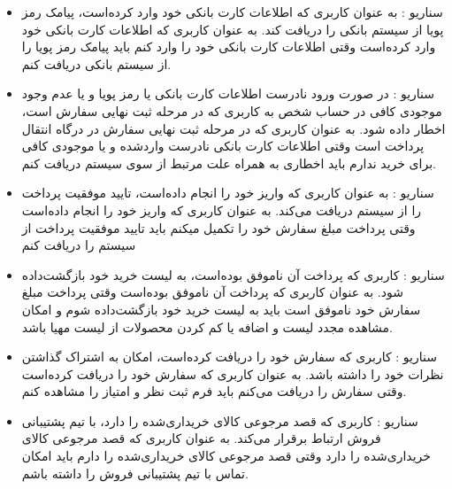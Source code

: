 \documentclass[14pt]{article}
\begin{document}
\begin{flushright}
\begin{itemize}
\item سناریو : به عنوان کاربری که اطلاعات کارت بانکی خود وارد کرده‌است، پیامک رمز پویا از سیستم بانکی را دریافت کند.
\newline
به عنوان کاربری که اطلاعات کارت بانکی خود وارد کرده‌است
\newline
وقتی اطلاعات کارت بانکی خود را وارد کنم 
\newline
باید پیامک رمز پویا را از سیستم بانکی دریافت کنم.

\item سناریو : در صورت ورود نادرست اطلاعات کارت بانکی یا رمز پویا و یا عدم وجود موجودی کافی در حساب شخص به کاربری که در مرحله ثبت نهایی سفارش است، اخطار داده شود.
\newline
به عنوان کاربری که در مرحله ثبت نهایی سفارش در درگاه انتقال پرداخت است
\newline
وقتی اطلاعات کارت بانکی نادرست وارد‌شده و یا موجودی کافی برای خرید ندارم
\newline
باید اخطاری به همراه علت مرتبط از سوی سیستم دریافت کنم.

\item سناریو : به عنوان کاربری که واریز خود را انجام داده‌است، تایید موفقیت پرداخت را از سیستم دریافت می‌کند.
\newline
به عنوان کاربری که واریز خود را انجام داده‌است
\newline
وقتی پرداخت مبلغ سفارش خود را تکمیل میکنم
\newline
باید تایید موفقیت پرداخت از سیستم را دریافت کنم

\item سناریو : کاربری که پرداخت آن ناموفق بوده‌است، به لیست خرید خود بازگشت‌داده شود.
\newline
به عنوان کاربری که پرداخت آن ناموفق بوده‌است
\newline
وقتی پرداخت مبلغ سفارش خود ناموفق است
\newline
باید به لیست خرید خود بازگشت‌داده شوم و امکان مشاهده مجدد لیست و اضافه یا کم کردن محصولات از لیست مهیا باشد.

\item سناریو : کاربری که سفارش خود را دریافت کرده‌است، امکان به اشتراک گذاشتن نظرات خود را داشته باشد.
\newline
به عنوان کاربری که سفارش خود را دریافت کرده‌است
\newline
وقتی سفارش را دریافت می‌کنم
\newline
باید فرم ثبت نظر و امتیاز را مشاهده کنم.

\item سناریو : کاربری که قصد مرجوعی کالای خریداری‌شده را دارد، با تیم پشتیبانی فروش ارتباط برقرار می‌کند.
\newline
به عنوان کاربری که قصد مرجوعی کالای خریداری‌شده را دارد
\newline
وقتی قصد مرجوعی کالای خریداری‌شده را دارم
\newline
باید امکان تماس با تیم پشتیبانی فروش را داشته باشم.


\end{itemize}
\end{flushright}
\end{document}
